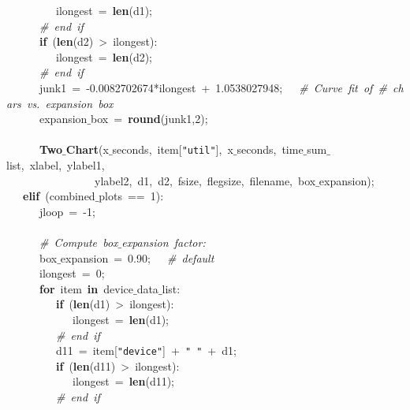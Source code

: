 \mbox{}\ \ \ \ \ \ \ \ \ ilongest\ =\ \textbf{len}(d1); \\
\mbox{}\ \ \ \ \ \ \textit{\#\ end\ if} \\
\mbox{}\ \ \ \ \ \ \textbf{if}\ (\textbf{len}(d2)\ \textgreater{}\ ilongest): \\
\mbox{}\ \ \ \ \ \ \ \ \ ilongest\ =\ \textbf{len}(d2); \\
\mbox{}\ \ \ \ \ \ \textit{\#\ end\ if} \\
\mbox{}\ \ \ \ \ \ junk1\ =\ -0.0082702674*ilongest\ +\ 1.0538027948;\ \ \ \textit{\#\ Curve\ fit\ of\ \#\ chars\ vs.\ expansion\ box} \\
\mbox{}\ \ \ \ \ \ expansion$\_$box\ =\ \textbf{round}(junk1,2); \\
\mbox{}\ \ \ \ \ \  \\
\mbox{}\ \ \ \ \ \ \textbf{Two$\_$Chart}(x$\_$seconds,\ item[\texttt{"{}util"{}}],\ x$\_$seconds,\ time$\_$sum$\_$list,\ xlabel,\ ylabel1,\  \\
\mbox{}\ \ \ \ \ \ \ \ \ \ \ \ \ \ \ \ ylabel2,\ d1,\ d2,\ fsize,\ flegsize,\ filename,\ box$\_$expansion); \\
\mbox{}\ \ \ \textbf{elif}\ (combined$\_$plots\ ==\ 1): \\
\mbox{}\ \ \ \ \ \ jloop\ =\ -1; \\
\mbox{}\ \ \ \ \ \  \\
\mbox{}\ \ \ \ \ \ \textit{\#\ Compute\ box$\_$expansion\ factor:} \\
\mbox{}\ \ \ \ \ \ box$\_$expansion\ =\ 0.90;\ \ \ \textit{\#\ default} \\
\mbox{}\ \ \ \ \ \ ilongest\ =\ 0; \\
\mbox{}\ \ \ \ \ \ \textbf{for}\ item\ \textbf{in}\ device$\_$data$\_$list: \\
\mbox{}\ \ \ \ \ \ \ \ \ \textbf{if}\ (\textbf{len}(d1)\ \textgreater{}\ ilongest): \\
\mbox{}\ \ \ \ \ \ \ \ \ \ \ \ ilongest\ =\ \textbf{len}(d1); \\
\mbox{}\ \ \ \ \ \ \ \ \ \textit{\#\ end\ if} \\
\mbox{}\ \ \ \ \ \ \ \ \ d11\ =\ item[\texttt{"{}device"{}}]\ +\ \texttt{"{}\ "{}}\ +\ d1; \\
\mbox{}\ \ \ \ \ \ \ \ \ \textbf{if}\ (\textbf{len}(d11)\ \textgreater{}\ ilongest): \\
\mbox{}\ \ \ \ \ \ \ \ \ \ \ \ ilongest\ =\ \textbf{len}(d11); \\
\mbox{}\ \ \ \ \ \ \ \ \ \textit{\#\ end\ if} \\
